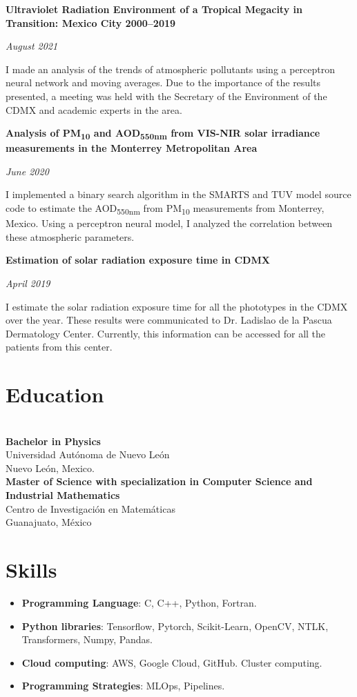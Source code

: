 \documentclass[a3paper]{adcv_color}
\newcommand{\proyect}[3]{\begin{minipage}{1\linewidth}
		\begin{minipage}{0.8\linewidth}
			\textbf{#1}
		\end{minipage}
		\begin{minipage}{0.19\linewidth}
			\begin{flushright}
				\vspace{#3cm}
				\textit{#2}
			\end{flushright}
		\end{minipage}
	\end{minipage}
	\vspace{-0.9cm}
}
\begin{document}
\proyect{Ultraviolet Radiation Environment of a Tropical Megacity in Transition: Mexico City 2000–2019}{August 2021}{-0.5}
\begin{flushleft}
	I made an analysis of the trends of atmospheric pollutants using a perceptron neural network and moving averages. Due to the importance of the results presented, a meeting was held with the Secretary of the Environment of the CDMX and academic experts in the area.
\end{flushleft}
\proyect{Analysis of PM\textsubscript{10} and AOD\textsubscript{550nm} from VIS-NIR solar irradiance measurements in the Monterrey Metropolitan Area}{June 2020}{-0.6}
\begin{flushleft}
	I implemented a binary search algorithm in the SMARTS and TUV model source code to estimate the AOD\textsubscript{550nm} from PM\textsubscript{10} measurements from Monterrey, Mexico. Using a perceptron neural model, I analyzed the correlation between these atmospheric parameters.
\end{flushleft}
\proyect{Estimation of solar radiation exposure time in CDMX}{April 2019}{0}
\vspace{-0.3cm}
\begin{flushleft}
	I estimate the solar radiation exposure time for all the phototypes in the CDMX over the year. These results were communicated to Dr. Ladislao de la Pascua Dermatology Center. Currently, this information can be accessed for all the patients from this center.
\end{flushleft}
\begin{minipage}{0.45\linewidth}
	\section{Education}\\

	\textbf{Bachelor in Physics} \\
	Universidad Autónoma de Nuevo León\\
	Nuevo León, Mexico.\\

	\textbf{Master of Science with specialization in Computer Science and Industrial Mathematics}\\
	Centro de Investigación en Matemáticas\\
	Guanajuato, México
\end{minipage}
\begin{minipage}{0.55\linewidth}
	\section{Skills}
	\begin{itemize}
		\item \textbf{Programming Language}:
		      C, C++, Python, Fortran.
		\item \textbf{Python libraries}:
		      Tensorflow, Pytorch, Scikit-Learn, OpenCV, NTLK, Transformers, Numpy, Pandas.
		\item \textbf{Cloud computing}:
		      AWS, Google Cloud, GitHub. Cluster computing.
		\item \textbf{Programming Strategies}:
		      MLOps, Pipelines.
	\end{itemize}
\end{minipage}
\end{document}
